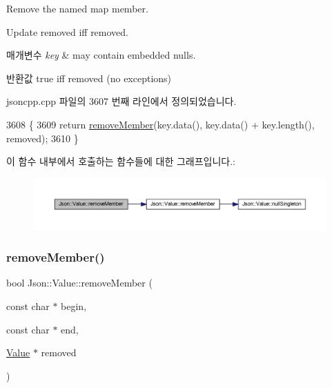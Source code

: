 Remove the named map member. 

Update \textquotesingle{}removed\textquotesingle{} iff removed. 
\begin{DoxyParams}{매개변수}
{\em key} & may contain embedded nulls. \\
\hline
\end{DoxyParams}
\begin{DoxyReturn}{반환값}
true iff removed (no exceptions) 
\end{DoxyReturn}


jsoncpp.\+cpp 파일의 3607 번째 라인에서 정의되었습니다.


\begin{DoxyCode}
3608 \{
3609   \textcolor{keywordflow}{return} \hyperlink{class_json_1_1_value_aa52f7873b95d29627d6e83ba96f69aaa}{removeMember}(key.data(), key.data() + key.length(), removed);
3610 \}
\end{DoxyCode}
이 함수 내부에서 호출하는 함수들에 대한 그래프입니다.\+:\nopagebreak
\begin{figure}[H]
\begin{center}
\leavevmode
\includegraphics[width=350pt]{class_json_1_1_value_ae385ecef98427970df525ee876e9f54a_cgraph}
\end{center}
\end{figure}
\mbox{\label{class_json_1_1_value_a49c91af727d6b4eb0af02a81bb2def87}} 
\subsubsection{\texorpdfstring{remove\+Member()}{removeMember()}\hspace{0.1cm}{\footnotesize\ttfamily [5/5]}}
{\footnotesize\ttfamily bool Json\+::\+Value\+::remove\+Member (\begin{DoxyParamCaption}\item[{const char $\ast$}]{begin,  }\item[{const char $\ast$}]{end,  }\item[{\hyperlink{class_json_1_1_value}{Value} $\ast$}]{removed }\end{DoxyParamCaption})}



